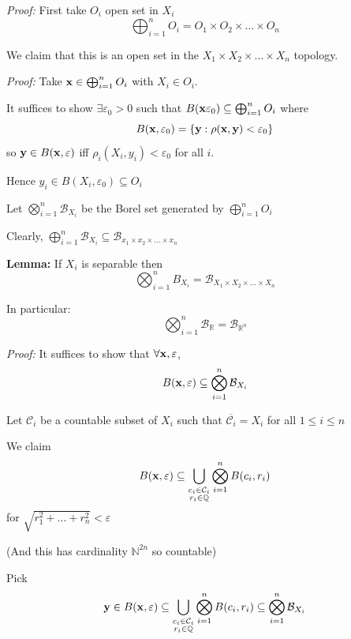 \documentclass[12pt]{report}
\newcommand{\R}{\mathbb{R}}
\newcommand{\N}{\mathbb{N}}
\newcommand{\Q}{\mathbb{Q}}
\newcommand{\ep}{\varepsilon}
\newcommand{\B}{\mathcal{B}}
\newcommand{\sub}{\subseteq}
\renewcommand{\bar}[1]{\overline{#1}}
\newcommand*{\tbf}[1]{\ifmmode\mathbf{#1}\else\textbf{#1}\fi}
\newenvironment*{tbox}[2][gray]{
    \begin{tcolorbox}[
        parbox=false,
        colback=#1!5!white,
        colframe=#1!75!black,
        breakable,
        title={#2}
    ]}
    {\end{tcolorbox}}
\newenvironment*{proof}[1][blue]{
\begin{tcolorbox}[
    parbox=false,
    colback=#1!5!white,
    colframe=#1!75!black,
    breakable
]}
{\end{tcolorbox}}
\begin{document}
    \begin{tbox}{\textbf{Proposition:} $B_{\R^n}$ is $\bigotimes_{i=1}^n \B_{\R}$ }
        \emph{Proof:} First take $O_i$ open set in $X_i$ 
        \[\bigoplus_{i=1}^n O_i = O_1 \times O_2 \times \dots \times O_n \]

        We claim that this is an open set in the $X_1 \times X_2 \times \dots \times X_n$ topology.

        \begin{proof}
            \emph{Proof:} Take $\tbf{x} \in \bigoplus_{i=1}^n O_i$ with $X_i \in O_i$. 

            It suffices to show $\exists \ep_0 > 0$ such that $B(\tbf{x} \ep_0) \sub \bigoplus_{i=1}^n O_i$ where 
            \[B(\tbf{x}, \ep_0) = \{\tbf{y}: \rho(\tbf{x}, \tbf{y}) < \ep_0\}\]
            so $\tbf{y} \in B(\tbf{x}, \ep)$ iff $\rho_i(X_i, y_i) < \ep_0$ for all $i$.

            Hence $y_i \in B(X_i, \ep_0) \sub O_i$
        \end{proof}

        Let $\bigotimes_{i=1}^n \B_{X_i}$ be the Borel set generated by $\bigoplus_{i=1}^n O_i$ 
        
        Clearly, $\bigoplus_{i=1}^n \B_{X_i} \sub \B_{x_1 \times x_2 \times \dots \times x_n}$
        
        \textbf{Lemma:} If $X_i$ is separable then 
        \[\bigotimes_{i=1}^n B_{X_i} = \B_{X_1 \times X_2 \times \dots\times X_n}\]

        In particular: 
        \[\bigotimes_{i=1}^n \B_{\R} = \B_{\R^n}\]

        \begin{proof}
            \emph{Proof:} It suffices to show that $\forall \tbf{x}, \ep$, 
            \[B(\tbf{x}, \ep) \sub \bigotimes_{i=1}^n \B_{X_i}\]

            Let $\mathcal{C}_i$ be a countable subset of $X_i$ such that $\bar{\mathcal{C}_i} = X_i$ for all $1 \leq i \leq n$

            We claim 
            \[B(\tbf{x}, \ep) \sub \bigcup_{\begin{subarray}{c} c_i \in \mathcal{C}_i \\ r_i \in \Q \end{subarray}} \bigotimes_{i=1}^n B(c_i, r_i)\]
            for $\sqrt{r_1^2 + \dots + r_n^2} < \ep$

            (And this has cardinality $\N^{2n}$ so countable)

            Pick 
            \[\tbf{y} \in B(\tbf{x}, \ep) \sub \bigcup_{\begin{subarray}{c} c_i \in \mathcal{C}_i \\ r_i \in \Q \end{subarray}} \bigotimes_{i=1}^n B(c_i, r_i) \sub \bigotimes_{i=1}^n \B_{X_i}\] 


\end{proof}
\end{tbox}
\end{document}

